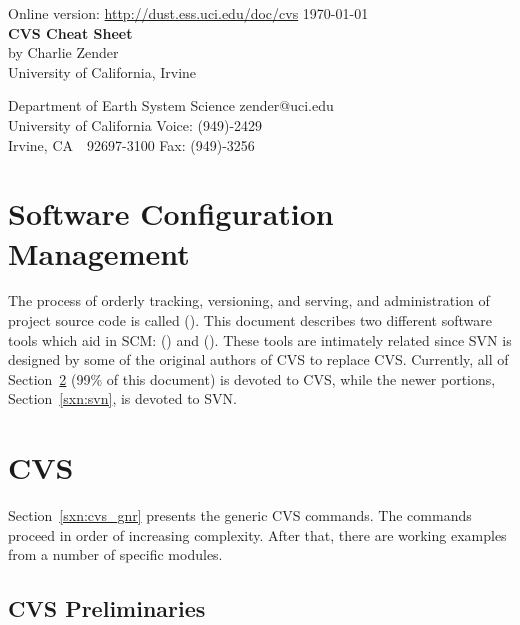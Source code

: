 \documentclass[12pt,twoside]{article}
\begin{document}
\begin{center}
Online version: \url{http://dust.ess.uci.edu/doc/cvs} \hfill \today\\
\bigskip
\bigskip
{\Large \textbf{CVS Cheat Sheet}}\\
\bigskip
by Charlie Zender\\
University of California, Irvine\\
\end{center}
Department of Earth System Science \hfill zender@uci.edu\\
University of California \hfill Voice: (949)-2429\\
Irvine, CA~~92697-3100 \hfill Fax: (949)-3256

\setcounter{page}{1}
\pagestyle{headings}
\thispagestyle{empty}
\tableofcontents
{}
\setcounter{page}{1}
\thispagestyle{empty}

\section{Software Configuration Management}
The process of orderly tracking, versioning, and serving, and
administration of project source code is called
 ().
This document describes two different software tools which aid in SCM:
\href{http://www.cvshome.org}{}
() and 
\href{http://subversion.tigris.org}{} ().
These tools are intimately related since SVN is designed by some of
the original authors of CVS to replace CVS.
Currently, all of Section~\ref{sxn:cvs} (99\% of this document)
is devoted to CVS, while the newer portions, Section~\ref{sxn:svn},
is devoted to SVN.

\section{CVS}\label{sxn:cvs}

Section~\ref{sxn:cvs_gnr} presents the generic CVS commands.
The commands proceed in order of increasing complexity. 
After that, there are working examples from a number of specific
modules.  

\subsection{CVS Preliminaries}\label{sxn:cvs_prl}
\end{document}
